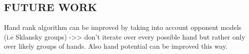 \subsection{FUTURE WORK}
Hand rank algorithm can be improved by taking into account opponent models (i.e Sklansky groups) ->> don't iterate over every possible hand but rather only over likely groups of hands. Also hand potential can be improved this way.

\FloatBarrier\label{end-of-document}



